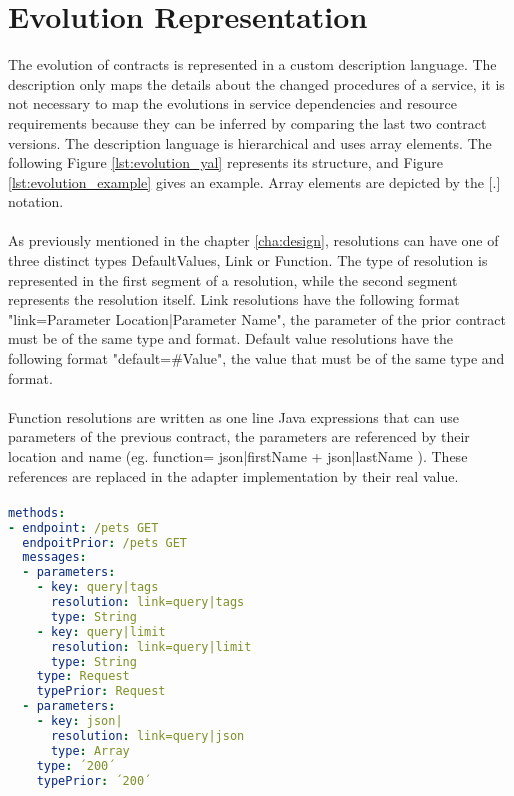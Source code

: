 \newpage

\section{Evolution Representation} %
\label{sec:evolution_representation}

The evolution of contracts is represented in a custom description language.
The description only maps the details about the changed procedures of a service,
it is not necessary to map the evolutions in service dependencies and resource requirements because they can be inferred by comparing the last two contract versions.
The description language is hierarchical and uses array elements.
The following Figure \ref{lst:evolution_yal} represents its structure, and Figure \ref{lst:evolution_example} gives an example.
Array elements are depicted by the [.] notation.

\paragraph{}

As previously mentioned in the chapter \ref{cha:design}, resolutions can have one of three distinct types {\selectfont  DefaultValues, Link or Function}.
The type of resolution is represented in the first segment of a resolution, while the second segment represents the resolution itself.
Link resolutions have the following format "link={Parameter Location}|{Parameter Name}", the parameter of the prior contract must be of the same type and format.
Default value resolutions have the following format "default=#Value", the value that must be of the same type and format.

\paragraph{}

Function resolutions are written as one line Java expressions that can use parameters of the previous contract, the
parameters are referenced by their location and name (eg. function= {{json|firstName}} + {{json|lastName}} ).
These references are replaced in the adapter implementation by their real value.

\paragraph{}

\begin{lstlisting}[language=yaml, caption=Evolution specification example, label=lst:evolution_example]
methods:
- endpoint: /pets GET
  endpoitPrior: /pets GET
  messages:
  - parameters:
    - key: query|tags
      resolution: link=query|tags
      type: String
    - key: query|limit
      resolution: link=query|limit
      type: String
    type: Request
    typePrior: Request
  - parameters:
    - key: json|
      resolution: link=query|json
      type: Array
    type: ´200´
    typePrior: ´200´
\end{lstlisting}

